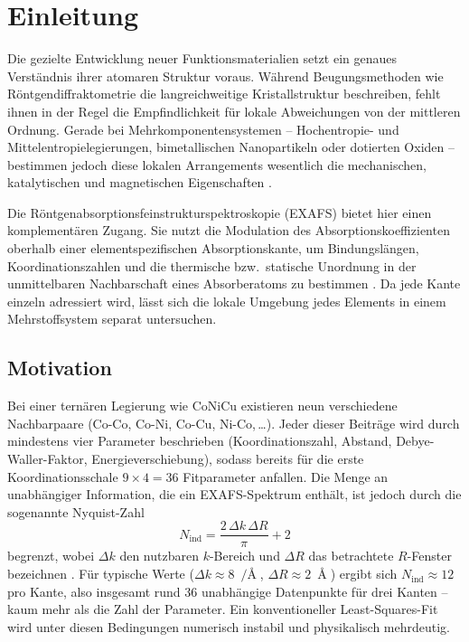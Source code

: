 \chapter{Einleitung}
\label{ch:einleitung}

Die gezielte Entwicklung neuer Funktionsmaterialien setzt ein genaues
Verständnis ihrer atomaren Struktur voraus.
Während Beugungsmethoden wie Röntgendiffraktometrie die langreichweitige
Kristallstruktur beschreiben, fehlt ihnen in der Regel die Empfindlichkeit
für lokale Abweichungen von der mittleren Ordnung.
Gerade bei Mehrkomponentensystemen -- Hochentropie- und
Mittelentropielegierungen, bimetallischen Nanopartikeln oder dotierten
Oxiden -- bestimmen jedoch diese lokalen Arrangements wesentlich die
mechanischen, katalytischen und magnetischen Eigenschaften
\cite{Yeh2004, George2019, Ferrando2008}.

Die Röntgenabsorptionsfeinstrukturspektroskopie (EXAFS) bietet hier einen
komplementären Zugang.
Sie nutzt die Modulation des Absorptionskoeffizienten oberhalb einer
elementspezifischen Absorptionskante, um Bindungslängen,
Koordinationszahlen und die thermische bzw.\ statische Unordnung in der
unmittelbaren Nachbarschaft eines Absorberatoms zu bestimmen
\cite{Stern1974, Rehr2000}.
Da jede Kante einzeln adressiert wird, lässt sich die lokale Umgebung
jedes Elements in einem Mehrstoffsystem separat untersuchen.

\section{Motivation}

Bei einer ternären Legierung wie CoNiCu existieren neun verschiedene
Nachbarpaare (Co-Co, Co-Ni, Co-Cu, Ni-Co,\,\ldots).
Jeder dieser Beiträge wird durch mindestens vier Parameter beschrieben
(Koordinationszahl, Abstand, Debye-Waller-Faktor, Energieverschiebung),
sodass bereits für die erste Koordinationsschale $9 \times 4 = 36$
Fitparameter anfallen.
Die Menge an unabhängiger Information, die ein EXAFS-Spektrum enthält,
ist jedoch durch die sogenannte Nyquist-Zahl
\begin{equation}
  N_{\text{ind}} = \frac{2\,\Delta k\,\Delta R}{\pi} + 2
  \label{eq:nyquist}
\end{equation}
begrenzt, wobei $\Delta k$ den nutzbaren $k$-Bereich und $\Delta R$ das
betrachtete $R$-Fenster bezeichnen \cite{Stern1993}.
Für typische Werte ($\Delta k \approx \SI{8}{\per\Angstrom}$,
$\Delta R \approx \SI{2}{\Angstrom}$) ergibt sich
$N_{\text{ind}} \approx 12$ pro Kante, also insgesamt rund 36 unabhängige
Datenpunkte für drei Kanten -- kaum mehr als die Zahl der Parameter.
Ein konventioneller Least-Squares-Fit wird unter diesen Bedingungen
numerisch instabil und physikalisch mehrdeutig.

